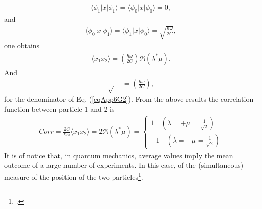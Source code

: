 \begin{subappendices}
\begin{align}\label{eqApp6G4}
\langle\phi_1|x|\phi_1\rangle=\langle\phi_0|x|\phi_0\rangle=0,
\end{align} 
and
\begin{align}\label{eqApp6G5}
\langle\phi_0|x|\phi_1\rangle=\langle\phi_1|x|\phi_0\rangle=\sqrt{\frac{\hbar\omega}{2C}},
\end{align}
one obtains
\begin{align}\label{eqApp6G6}
\langle x_1x_2\rangle=\left(\frac{\hbar\omega}{2C}\right)\Re(\lambda^*\mu).
\end{align} 
And 
\begin{align}\label{eqApp6G7}
\sqrt{\quad}=\left(\frac{\hbar\omega}{2C}\right),
\end{align}
for the denominator of Eq. (\ref{eqApp6G2}).
From the above results the correlation function between particle 1 and 2 is
\begin{align}\label{eqApp6G8}
Corr=\frac{2C}{\hbar\omega}\langle x_1x_2\rangle=2\Re(\lambda^*\mu)=
\left\{
\begin{array}{c}
 1\quad (\lambda=+\mu=\frac{1}{\sqrt{2}})\\ 
 -1 \quad (\lambda=-\mu=\frac{1}{\sqrt{2}})
\end{array}
\right. 
\end{align}
It is of notice that, in quantum mechanics, average values imply the mean outcome of a large number of experiments. In this case, of the (simultaneous) measure of the position of the two particles\footnote{\cite{Basdevant:05}.}.







\end{subappendices}
